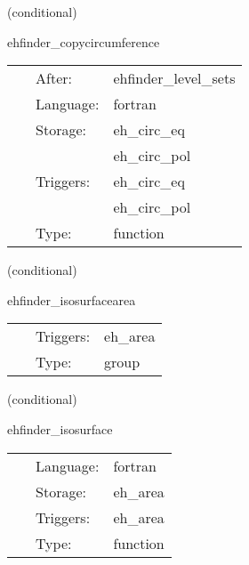 \vspace{5mm}

   (conditional) 

\hspace{5mm} ehfinder\_copycircumference 

\hspace{5mm}{\it copy circumferences to output variable } 


\hspace{5mm}

 \begin{tabular*}{160mm}{cll} 
~ & After:  & ehfinder\_level\_sets \\ 
~ & Language:  & fortran \\ 
~ & Storage:  & eh\_circ\_eq \\ 
~& ~ &eh\_circ\_pol\\ 
~ & Triggers:  & eh\_circ\_eq \\ 
~& ~ &eh\_circ\_pol\\ 
~ & Type:  & function \\ 
\end{tabular*} 


\vspace{5mm}

   (conditional) 

\hspace{5mm} ehfinder\_isosurfacearea 

\hspace{5mm}{\it find isosurfaces and calculate the area } 


\hspace{5mm}

 \begin{tabular*}{160mm}{cll} 
~ & Triggers:  & eh\_area \\ 
~ & Type:  & group \\ 
\end{tabular*} 


\vspace{5mm}

   (conditional) 

\hspace{5mm} ehfinder\_isosurface 

\hspace{5mm}{\it find isosurfaces } 


\hspace{5mm}

 \begin{tabular*}{160mm}{cll} 
~ & Language:  & fortran \\ 
~ & Storage:  & eh\_area \\ 
~ & Triggers:  & eh\_area \\ 
~ & Type:  & function \\ 
\end{tabular*} 


